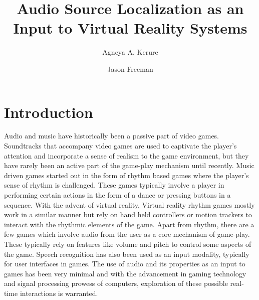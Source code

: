\documentclass[convention]{aesconf}
\title{Audio Source Localization as an Input to Virtual Reality Systems}
\author[1]{Agneya A. Kerure}
\author[1]{Jason Freeman}
\affil[1]{Georgia Institute of Technology}
\begin{document}

\section{Introduction}
Audio and music have historically been a passive part of video games. Soundtracks that accompany video games are used to captivate the player's attention and incorporate a sense of realism to the game environment, but they have rarely been an active part of the game-play mechanism until recently.
Music driven games started out in the form of rhythm based games where the player's sense of rhythm is challenged. These games typically involve a player in performing certain actions in the form of a dance or pressing buttons in a sequence. With the advent of virtual reality, 
Virtual reality rhythm games mostly work in a similar manner but rely on hand held controllers or motion trackers to interact with the rhythmic elements of the game.
Apart from rhythm, there are a few games which involve audio from the user as a core mechanism of game-play. These typically rely on features like volume and pitch to control some aspects of the game.
Speech recognition has also been used as an input modality, typically for user interfaces in games.
The use of audio and its properties as an input to games has been very minimal and with the advancement in gaming technology and signal processing prowess of computers, exploration of these possible real-time interactions is warranted.
 
\end{document}
